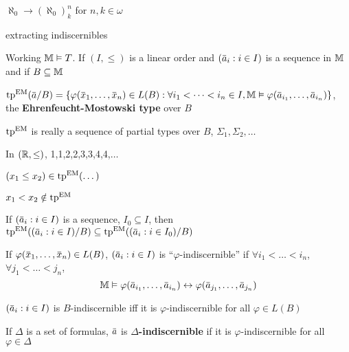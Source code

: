 \documentclass[11pt]{article}
\begin{document}
\begin{fact}
\(\aleph_0\to(\aleph_0)^n_k\) for \(n,k\in\omega\)
\end{fact}

extracting indiscernibles

Working \(\mathbb{M}\vDash T\). If \((I,\le)\) is a linear order and \((\bara_i:i\in I)\) is a sequence in \(\mathbb{M}\)
and if \(B\subseteq\mathbb{M}\)

\begin{definition}[]
\(\tp^{\EM}(\bara/B)=\{\varphi(\barx_1,\dots,\barx_n)\in L(B):\forall i_1<\dots<i_n\in I, \M\vDash\varphi(\bara_{i_1},\dots,\bara_{i_n})\}\),
the \textbf{Ehrenfeucht-Mostowski type} over \(B\)
\end{definition}

\begin{remark}
\(\operatorname{tp}^{\operatorname{EM}}\) is really a sequence of partial types over \(B\), \(\Sigma_1,\Sigma_2,\dots\)
\end{remark}

\begin{examplle}[]
In \((\mathbb{R},\le)\), 1,1,2,2,3,3,4,4,\(\dots\)

\((x_1\le x_2)\in\operatorname{tp}^{\operatorname{EM}}(\dots)\)

\(x_1<x_2\notin\operatorname{tp}^{\operatorname{EM}}\)
\end{examplle}

\begin{remark}
If \((\bara_i:i\in I)\) is a sequence, \(I_0\subseteq I\),
then \(\tp^{\EM}((\bara_i:i\in I)/B)\subseteq\tp^{\EM}((\bara_i:i\in I_0)/B)\)
\end{remark}

\begin{definition}[]
If \(\varphi(\barx_1,\dots,\barx_n)\in L(B)\), \((\bara_i:i\in I)\) is ``\(\varphi\)-indiscernible''
if \(\forall i_1<\dots<i_n\), \(\forall j_1<\dots<j_n\),
\begin{equation*}
\M\vDash\varphi(\bara_{i_1},\dots,\bara_{i_n})\leftrightarrow\varphi(\bara_{j_1},\dots,\bara_{j_n})
\end{equation*}
\end{definition}

\begin{remark}
\((\bara_i:i\in I)\) is \(B\)-indiscernible iff it is \(\varphi\)-indiscernible for all \(\varphi\in L(B)\)
\end{remark}

\begin{definition}[]
If \(\Delta\) is a set of formulas, \(\bara\) is \textbf{\(\Delta\)-indiscernible} if it is \(\varphi\)-indiscernible for
all \(\varphi\in\Delta\)
\end{definition}
\end{document}
